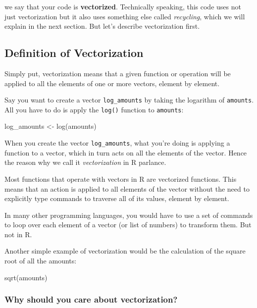 \documentclass[
]{book}
\newenvironment{Shaded}{\begin{snugshade}}{\end{snugshade}}
\newcommand{\FunctionTok}[1]{\textcolor[rgb]{0.00,0.00,0.00}{#1}}
\newcommand{\NormalTok}[1]{#1}
\newcommand{\OtherTok}[1]{\textcolor[rgb]{0.56,0.35,0.01}{#1}}
\begin{document}
we say that your code is \textbf{vectorized}. Technically speaking, this code uses
not just vectorization but it also uses something else called \emph{recycling}, which
we will explain in the next section. But let's describe vectorization first.

\hypertarget{definition-of-vectorization}{%
\subsection{Definition of Vectorization}\label{definition-of-vectorization}}

Simply put, vectorization means that a given function or operation will be
applied to all the elements of one or more vectors, element by element.

Say you want to create a vector \texttt{log\_amounts} by taking the logarithm of
\texttt{amounts}. All you have to do is apply the \texttt{log()} function to \texttt{amounts}:

\begin{Shaded}
\begin{Highlighting}[]
\NormalTok{log\_amounts }\OtherTok{\textless{}{-}} \FunctionTok{log}\NormalTok{(amounts)}
\end{Highlighting}
\end{Shaded}

When you create the vector \texttt{log\_amounts}, what you're doing is applying a
function to a vector, which in turn acts on all the elements of the vector.
Hence the reason why we call it \emph{vectorization} in R parlance.

Most functions that operate with vectors in R are vectorized functions. This
means that an action is applied to all elements of the vector without the need
to explicitly type commands to traverse all of its values, element by element.

In many other programming languages, you would have to use a set of commands
to loop over each element of a vector (or list of numbers) to transform them.
But not in R.

Another simple example of vectorization would be the calculation of the square
root of all the amounts:

\begin{Shaded}
\begin{Highlighting}[]
\FunctionTok{sqrt}\NormalTok{(amounts)}
\end{Highlighting}
\end{Shaded}

\hypertarget{why-should-you-care-about-vectorization}{%
\subsubsection*{Why should you care about vectorization?}\label{why-should-you-care-about-vectorization}}
\end{document}
